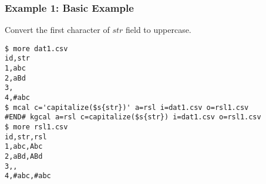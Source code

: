 \subsubsection*{Example 1: Basic Example}

Convert the first character of $str$ field to uppercase.


\begin{Verbatim}[baselinestretch=0.7,frame=single]
$ more dat1.csv
id,str
1,abc
2,aBd
3,
4,#abc
$ mcal c='capitalize($s{str})' a=rsl i=dat1.csv o=rsl1.csv
#END# kgcal a=rsl c=capitalize($s{str}) i=dat1.csv o=rsl1.csv
$ more rsl1.csv
id,str,rsl
1,abc,Abc
2,aBd,ABd
3,,
4,#abc,#abc
\end{Verbatim}
